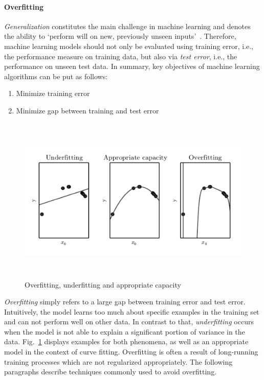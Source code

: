 \paragraph{Overfitting}

\textit{Generalization} constitutes the main challenge in machine learning and
denotes the ability to `perform will on new, previously unseen inputs'~\cite[p. 110]{Goodfellow2016}.
Therefore, machine learning models should not only be evaluated using training
error, i.e., the performance measure on training data, but also via \textit{test
error}, i.e., the performance on unseen test data.
In summary, key objectives of machine learning algorithms can be put as follows:

\begin{enumerate}
  \item Minimize training error
  \item Minimize gap between training and test error
\end{enumerate}

\begin{figure}[h]
  \centering
  \includegraphics[height=8cm]{img/overfitting}
  \caption[Overfitting, underfitting and appropriate capacity]{Overfitting, underfitting and appropriate capacity~\cite{Goodfellow2016}}
\label{fig:overfitting}
\end{figure}

\textit{Overfitting} simply refers to a large gap between training error and test
error.
Intuitively, the model learns too much about specific examples in the training
set and can not perform well on other data.
In contrast to that, \textit{underfitting} occurs when the model is not able
to explain a significant portion of variance in the data.
Fig.~\ref{fig:overfitting} displays examples for both phenomena, as well as
an appropriate model in the context of curve fitting.
Overfitting is often a result of long-running training processes which are
not regularized appropriately.
The following paragraphs describe techniques commonly used to avoid overfitting.

